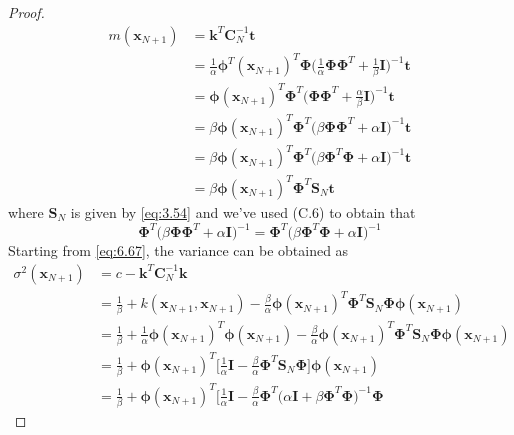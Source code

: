 \begin{proof}
\begin{align*}
        m(\mathbf{x}_{N + 1}) 
        &= \mathbf{k}^T \mathbf{C}_N^{-1} \mathbf{t} \\
        &= \frac{1}{\alpha}\bm{\phi}^T(\mathbf{x}_{N + 1})^T \bm{\Phi}
        \bigg(\frac{1}{\alpha} \bm{\Phi}\bm{\Phi}^T 
            + \frac{1}{\beta} \mathbf{I}\bigg)^{-1}\mathbf{t} \\
        &= \bm{\phi}(\mathbf{x}_{N + 1})^T \bm{\Phi}^T
        \bigg(\bm{\Phi}\bm{\Phi}^T + \frac{\alpha}{\beta} \mathbf{I}\bigg)^{-1}\mathbf{t} \\
        &= \beta \bm{\phi}(\mathbf{x}_{N + 1})^T \bm{\Phi}^T
        \big(\beta \bm{\Phi}\bm{\Phi}^T + \alpha \mathbf{I}\big)^{-1}\mathbf{t} \\
        &= \beta \bm{\phi}(\mathbf{x}_{N + 1})^T \bm{\Phi}^T
        \big(\beta \bm{\Phi}^T\bm{\Phi} + \alpha \mathbf{I}\big)^{-1}\mathbf{t} \\
        &= \beta\bm{\phi}(\mathbf{x}_{N + 1})^T \bm{\Phi}^T \mathbf{S}_N \mathbf{t}
    \end{align*}
    where $\mathbf{S}_N$ is given by \eqref{eq:3.54} and we've used (C.6) to obtain that
    \[
        \bm{\Phi}^T \big(\beta \bm{\Phi}\bm{\Phi}^T + \alpha \mathbf{I}\big)^{-1}
        = \bm{\Phi}^T \big(\beta \bm{\Phi}^T\bm{\Phi} + \alpha \mathbf{I}\big)^{-1}
    \] 
    Starting from \eqref{eq:6.67}, the variance can be obtained as
    \begin{align*}
        \sigma^2(\mathbf{x}_{N + 1})
        &= c - \mathbf{k}^T \mathbf{C}_N^{-1} \mathbf{k} \\
        &= \frac{1}{\beta} + k(\mathbf{x}_{N + 1}, \mathbf{x}_{N + 1}) 
        - \frac{\beta}{\alpha} \bm{\phi}(\mathbf{x}_{N + 1})^T
        \bm{\Phi}^T \mathbf{S}_N \bm{\Phi} \bm{\phi}(\mathbf{x}_{N + 1}) \\
        &= \frac{1}{\beta} 
        + \frac{1}{\alpha}\bm{\phi}(\mathbf{x}_{N + 1})^T \bm{\phi}(\mathbf{x}_{N + 1})
        - \frac{\beta}{\alpha} \bm{\phi}(\mathbf{x}_{N + 1})^T
        \bm{\Phi}^T \mathbf{S}_N \bm{\Phi} \bm{\phi}(\mathbf{x}_{N + 1}) \\
        &= \frac{1}{\beta} + \bm{\phi}(\mathbf{x}_{N + 1})^T \bigg[
            \frac{1}{\alpha} \mathbf{I} - \frac{\beta}{\alpha} \bm{\Phi}^T \mathbf{S}_N \bm{\Phi}
        \bigg] \bm{\phi}(\mathbf{x}_{N + 1}) \\
        &= \frac{1}{\beta} + \bm{\phi}(\mathbf{x}_{N + 1})^T \bigg[
            \frac{1}{\alpha} \mathbf{I} - \frac{\beta}{\alpha} \bm{\Phi}^T 
            \big(\alpha \mathbf{I} + \beta \bm{\Phi}^T\bm{\Phi}\big)^{-1} \bm{\Phi}

\end{align*}
\end{proof}
